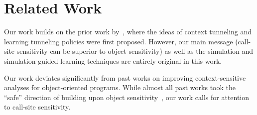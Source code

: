 
\section{Related Work}





Our work builds on the prior work by~\citet{JeJeOh18}, where the ideas
of context tunneling and learning tunneling policies were first
proposed.  
However, our main message (call-site sensitivity can be superior to object sensitivity) as well as the simulation and simulation-guided learning techniques are entirely original in this work. 









Our work deviates significantly from past works on improving context-sensitive analyses for object-oriented programs. 
While almost all past works took the ``safe'' direction of building upon object 
sensitivity~\cite{Smaragdakis2011,SridharanDCST12,TanLX16,Li2018b,Smaragdakis2014,Li2018a,JeJeChOh17,Liang2011,Liang2011learning,Lu:2019:PYF}, our
work calls for attention to call-site sensitivity.



